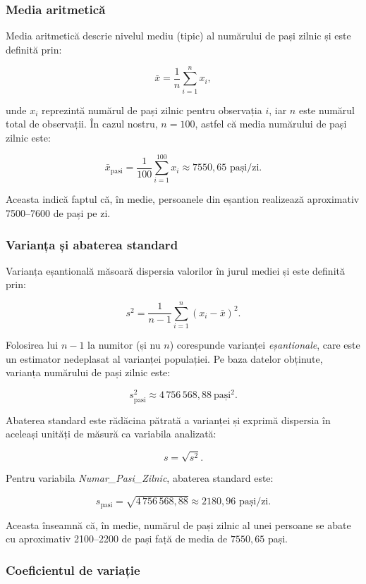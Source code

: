 \documentclass[12pt,a4paper]{report}
\begin{document}
\subsubsection*{Media aritmetică}

Media aritmetică descrie nivelul mediu (tipic) al numărului de pași zilnic și este definită prin:

$$
\bar{x} = \frac{1}{n} \sum_{i=1}^{n} x_i,
$$

unde \(x_i\) reprezintă numărul de pași zilnic pentru observația \(i\), iar \(n\) este numărul total de observații. În cazul nostru, \(n = 100\), astfel că media numărului de pași zilnic este:

$$
\bar{x}_{\text{pasi}} = \frac{1}{100} \sum_{i=1}^{100} x_i \approx 7550{,}65 \text{ pași/zi}.
$$

Aceasta indică faptul că, în medie, persoanele din eșantion realizează aproximativ 7500–7600 de pași pe zi.

\subsubsection*{Varianța și abaterea standard}

Varianța eșantională măsoară dispersia valorilor în jurul mediei și este definită prin:

$$
s^2 = \frac{1}{n - 1} \sum_{i=1}^{n} (x_i - \bar{x})^2.
$$

Folosirea lui \(n-1\) la numitor (și nu \(n\)) corespunde varianței \emph{eșantionale}, care este un estimator nedeplasat al varianței populației. Pe baza datelor obținute, varianța numărului de pași zilnic este:

$$
s^2_{\text{pasi}} \approx 4\,756\,568{,}88 \ \text{pași}^2.
$$

Abaterea standard este rădăcina pătrată a varianței și exprimă dispersia în aceleași unități de măsură ca variabila analizată:

$$
s = \sqrt{s^2}.
$$

Pentru variabila \textit{Numar\_Pasi\_Zilnic}, abaterea standard este:

$$
s_{\text{pasi}} = \sqrt{4\,756\,568{,}88} \approx 2180{,}96 \text{ pași/zi}.
$$

Aceasta înseamnă că, în medie, numărul de pași zilnic al unei persoane se abate cu aproximativ 2100–2200 de pași față de media de \(7550{,}65\) pași.

\subsubsection*{Coeficientul de variație}
\end{document}
